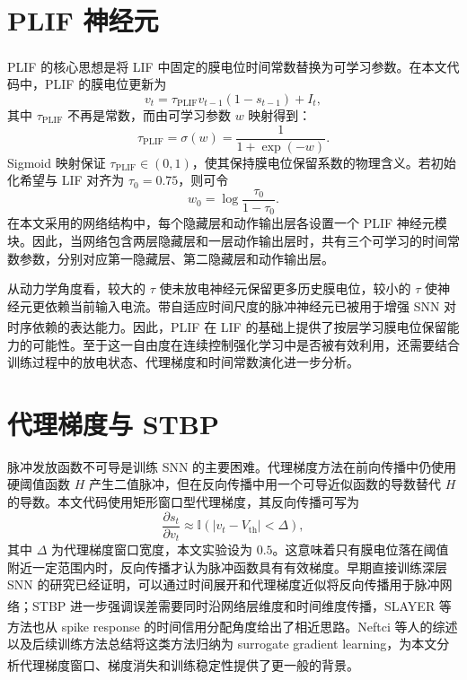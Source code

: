 \documentclass[UTF8,zihao=-4,oneside,openany]{ctexbook}
\let\oldcite\cite
\renewcommand{\cite}[1]{\textsuperscript{\oldcite{#1}}}
\begin{document}
\section{PLIF 神经元}
PLIF 的核心思想是将 LIF 中固定的膜电位时间常数替换为可学习参数\cite{fang2021plif}。在本文代码中，PLIF 的膜电位更新为
\begin{equation}
v_t=\tau_{\mathrm{PLIF}} v_{t-1}(1-s_{t-1})+I_t,
\end{equation}
其中 $\tau_{\mathrm{PLIF}}$ 不再是常数，而由可学习参数 $w$ 映射得到：
\begin{equation}
\tau_{\mathrm{PLIF}}=\sigma(w)=\frac{1}{1+\exp(-w)}.
\end{equation}
Sigmoid 映射保证 $\tau_{\mathrm{PLIF}}\in(0,1)$，使其保持膜电位保留系数的物理含义。若初始化希望与 LIF 对齐为 $\tau_0=0.75$，则可令
\begin{equation}
w_0=\log\frac{\tau_0}{1-\tau_0}.
\end{equation}
在本文采用的网络结构中，每个隐藏层和动作输出层各设置一个 PLIF 神经元模块。因此，当网络包含两层隐藏层和一层动作输出层时，共有三个可学习的时间常数参数，分别对应第一隐藏层、第二隐藏层和动作输出层。

从动力学角度看，较大的 $\tau$ 使未放电神经元保留更多历史膜电位，较小的 $\tau$ 使神经元更依赖当前输入电流。带自适应时间尺度的脉冲神经元已被用于增强 SNN 对时序依赖的表达能力\cite{bellec2018lsnn}。因此，PLIF 在 LIF 的基础上提供了按层学习膜电位保留能力的可能性。至于这一自由度在连续控制强化学习中是否被有效利用，还需要结合训练过程中的放电状态、代理梯度和时间常数演化进一步分析。

\section{代理梯度与 STBP}
脉冲发放函数不可导是训练 SNN 的主要困难。代理梯度方法在前向传播中仍使用硬阈值函数 $H$ 产生二值脉冲，但在反向传播中用一个可导近似函数的导数替代 $H$ 的导数。本文代码使用矩形窗口型代理梯度，其反向传播可写为
\begin{equation}
\frac{\partial s_t}{\partial v_t}\approx
\mathbb{I}\left(|v_t-V_{\mathrm{th}}|<\Delta\right),
\end{equation}
其中 $\Delta$ 为代理梯度窗口宽度，本文实验设为 $0.5$。这意味着只有膜电位落在阈值附近一定范围内时，反向传播才认为脉冲函数具有有效梯度。早期直接训练深层 SNN 的研究已经证明，可以通过时间展开和代理梯度近似将反向传播用于脉冲网络\cite{bohte2002error,lee2016backprop,zenke2018superspike}；STBP 进一步强调误差需要同时沿网络层维度和时间维度传播\cite{wu2018stbp}，SLAYER 等方法也从 spike response 的时间信用分配角度给出了相近思路\cite{shrestha2018slayer}。Neftci 等人的综述以及后续训练方法总结将这类方法归纳为 surrogate gradient learning，为本文分析代理梯度窗口、梯度消失和训练稳定性提供了更一般的背景\cite{neftci2019surrogate,eshraghian2023training}。
\end{document}
